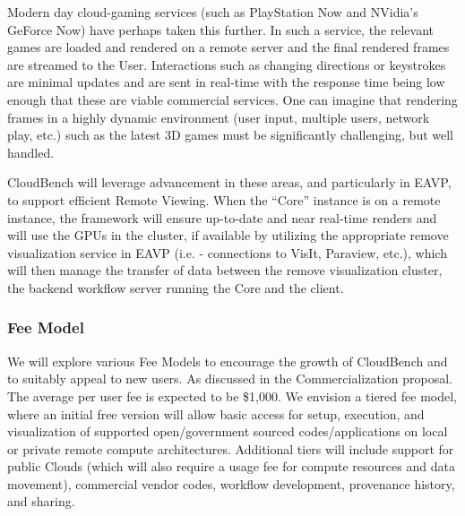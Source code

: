 Modern day cloud-gaming services (such as PlayStation Now and NVidia's 
GeForce Now) have perhaps taken this further. In such a service, the relevant 
games are loaded and rendered on a remote server and the final rendered frames 
are streamed to the User. Interactions such as changing directions or 
keystrokes are minimal updates and are sent in real-time with the response time 
being low enough that these are viable commercial services. One can imagine 
that rendering frames in a highly dynamic environment (user input, multiple 
users, network play, etc.) such as the latest 3D games must be significantly 
challenging, but well handled.

CloudBench will leverage advancement in these areas, and particularly in EAVP, to support efficient Remote 
Viewing. When the ``Core'' instance is on a remote instance, the framework will 
ensure up-to-date and near real-time renders and will use the GPUs in the 
cluster, if available by utilizing the appropriate remove visualization service in EAVP (i.e. - connections to VisIt, Paraview, etc.), which will then manage the transfer of data between the remove visualization cluster, the backend workflow server running the Core and the client. 


\subsubsection{Fee Model}
We will explore various Fee Models to encourage the growth of
CloudBench and to suitably appeal to new users. As discussed in the
Commercialization proposal. The average per user fee is expected to be
\$1,000. We envision a tiered fee model, where an initial free version
will allow basic access for setup, execution, and visualization of
supported open/government sourced codes/applications on local or
private remote compute architectures. Additional tiers will include
support for public Clouds (which will also require a usage fee for
compute resources and data movement), commercial vendor codes,
workflow development, provenance history, and sharing.

